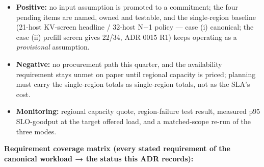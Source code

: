 \begin{itemize}
\tightlist
\item
  \textbf{Positive:} no input assumption is promoted to a commitment;
  the four pending items are named, owned and testable, and the
  single-region baseline (21-host KV-screen headline / 32-host N−1
  policy --- case (i) canonical; the case (ii) prefill screen gives
  22/34, ADR 0015 R1) keeps operating as a \emph{provisional}
  assumption.
\item
  \textbf{Negative:} no procurement path this quarter, and the
  availability requirement stays unmet on paper until regional capacity
  is priced; planning must carry the single-region totals as
  single-region totals, not as the SLA's cost.
\item
  \textbf{Monitoring:} regional capacity quote, region-failure test
  result, measured p95 SLO-goodput at the target offered load, and a
  matched-scope re-run of the three modes.
\end{itemize}

\textbf{Requirement coverage matrix (every stated requirement of the
canonical workload → the status this ADR records):}

